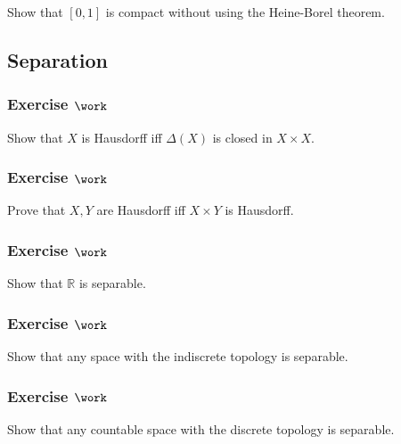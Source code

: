 Show that \([0, 1]\) is compact without using the Heine-Borel theorem.

\hypertarget{separation}{%
\subsection{Separation}\label{separation}}

\hypertarget{exercise-work-31}{%
\subsubsection{\texorpdfstring{Exercise
\(\work\)}{Exercise \textbackslash work}}\label{exercise-work-31}}

Show that \(X\) is Hausdorff iff \(\Delta(X)\) is closed in
\(X\times X\).

\hypertarget{exercise-work-32}{%
\subsubsection{\texorpdfstring{Exercise
\(\work\)}{Exercise \textbackslash work}}\label{exercise-work-32}}

Prove that \(X, Y\) are Hausdorff iff \(X\times Y\) is Hausdorff.

\hypertarget{exercise-work-33}{%
\subsubsection{\texorpdfstring{Exercise
\(\work\)}{Exercise \textbackslash work}}\label{exercise-work-33}}

Show that \({\mathbb{R}}\) is separable.

\hypertarget{exercise-work-34}{%
\subsubsection{\texorpdfstring{Exercise
\(\work\)}{Exercise \textbackslash work}}\label{exercise-work-34}}

Show that any space with the indiscrete topology is separable.

\hypertarget{exercise-work-35}{%
\subsubsection{\texorpdfstring{Exercise
\(\work\)}{Exercise \textbackslash work}}\label{exercise-work-35}}

Show that any countable space with the discrete topology is separable.

